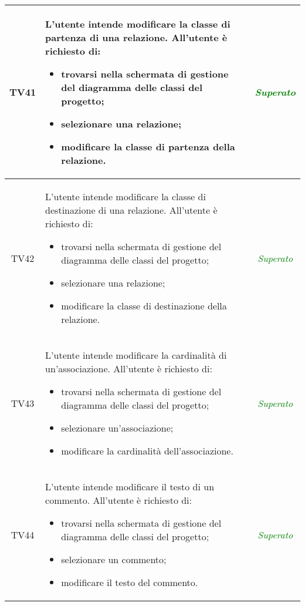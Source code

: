 \begin{longtable}{|c|>{}m{8cm}|c|}
\hypertarget{TV3.12.3}{TV41} & L'utente intende modificare la classe di partenza di una relazione.
All'utente è richiesto di:
\begin{itemize}
	\item trovarsi nella schermata di gestione del diagramma delle classi del progetto;
	\item selezionare una relazione;
	\item modificare la classe di partenza della relazione.
\end{itemize} & \textcolor{Green}{\textit{Superato}}\\ \hline

\hypertarget{TV3.12.4}{TV42} & L'utente intende modificare la classe di destinazione di una relazione.
All'utente è richiesto di:
\begin{itemize}
	\item trovarsi nella schermata di gestione del diagramma delle classi del progetto;
	\item selezionare una relazione;
	\item modificare la classe di destinazione della relazione.
\end{itemize} & \textcolor{Green}{\textit{Superato}}\\ \hline

\hypertarget{TV3.12.5}{TV43} & L'utente intende modificare la cardinalità di un'associazione.
All'utente è richiesto di:
\begin{itemize}
	\item trovarsi nella schermata di gestione del diagramma delle classi del progetto;
	\item selezionare un'associazione;
	\item modificare la cardinalità dell'associazione.
\end{itemize} & \textcolor{Green}{\textit{Superato}}\\ \hline

\hypertarget{TV3.13.1}{TV44} & L'utente intende modificare il testo di un commento. 
All'utente è richiesto di: 
\begin{itemize}
	\item trovarsi nella schermata di gestione del diagramma delle classi del progetto;
	\item selezionare un commento;
	\item modificare il testo del commento.
\end{itemize} & \textcolor{Green}{\textit{Superato}}\\ \hline


\end{longtable}
